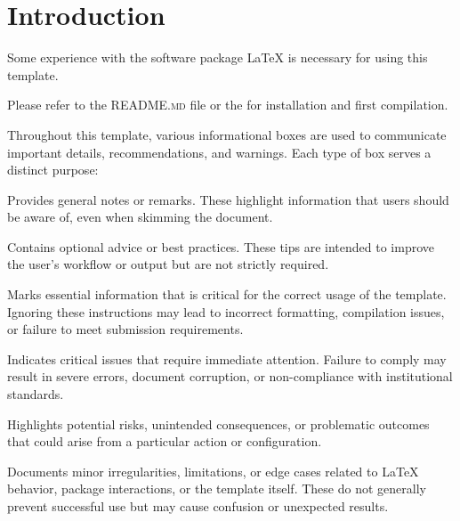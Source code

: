 \chapter{Introduction} %

Some experience with the software package {\LaTeX} is necessary for using this template.

Please refer to the \textsc{README.md} file or the  for installation and first compilation.

Throughout this template, various informational boxes are used to communicate important details, recommendations, and warnings. Each type of box serves a distinct purpose:

\begin{notebox}
    Provides general notes or remarks. These highlight information that users should be aware of, even when skimming the document.
\end{notebox}

\begin{tipbox}
    Contains optional advice or best practices. These tips are intended to improve the user’s workflow or output but are not strictly required.
\end{tipbox}

\begin{importantbox}
    Marks essential information that is critical for the correct usage of the template. Ignoring these instructions may lead to incorrect formatting, compilation issues, or failure to meet submission requirements.
\end{importantbox}

\begin{dangerbox}
    Indicates critical issues that require immediate attention. Failure to comply may result in severe errors, document corruption, or non-compliance with institutional standards.
\end{dangerbox}

\begin{warningbox}
    Highlights potential risks, unintended consequences, or problematic outcomes that could arise from a particular action or configuration.
\end{warningbox}

\begin{quirkbox}
    Documents minor irregularities, limitations, or edge cases related to {\LaTeX} behavior, package interactions, or the template itself. These do not generally prevent successful use but may cause confusion or unexpected results.
\end{quirkbox}

